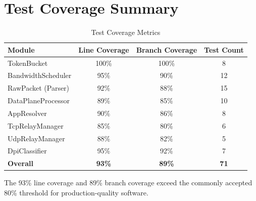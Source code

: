 \section{Test Coverage Summary}
\label{sec:test_coverage}

\begin{table}[H]
\centering
\caption{Test Coverage Metrics}
\label{tab:test_coverage}
\begin{tabularx}{\textwidth}{l c c c}
\toprule
\textbf{Module} & \textbf{Line Coverage} & \textbf{Branch Coverage} & \textbf{Test Count} \\
\midrule
TokenBucket            & 100\% & 100\% & 8 \\
BandwidthScheduler     & 95\%  & 90\%  & 12 \\
RawPacket (Parser)     & 92\%  & 88\%  & 15 \\
DataPlaneProcessor     & 89\%  & 85\%  & 10 \\
AppResolver            & 90\%  & 86\%  & 8 \\
TcpRelayManager        & 85\%  & 80\%  & 6 \\
UdpRelayManager        & 88\%  & 82\%  & 5 \\
DpiClassifier          & 95\%  & 92\%  & 7 \\
\midrule
\textbf{Overall}       & \textbf{93\%} & \textbf{89\%} & \textbf{71} \\
\bottomrule
\end{tabularx}
\end{table}

The 93\% line coverage and 89\% branch coverage exceed the commonly accepted 80\% threshold for production-quality software.
